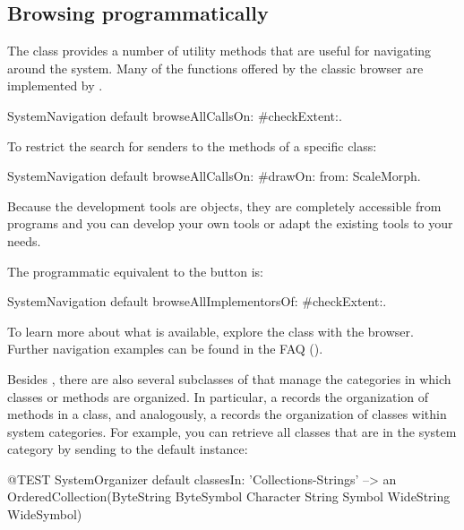 \documentclass[a4paper,10pt,twoside]{book}
\begin{document}

\subsection{Browsing programmatically}

The class  provides a number of utility methods that are useful for navigating around the system.
Many of the functions offered by the classic browser are implemented by .

\begin{code}{}
SystemNavigation default browseAllCallsOn: #checkExtent:.
\end{code}
To restrict the search for senders to the methods of a specific class:
\begin{code}{}
SystemNavigation default browseAllCallsOn: #drawOn: from: ScaleMorph.
\end{code}
Because the development tools are objects, they are completely accessible from programs and you can develop your own tools or adapt the existing tools to your needs.

The programmatic equivalent to the  button is:
\begin{code}{}
SystemNavigation default browseAllImplementorsOf: #checkExtent:.
\end{code}

To learn more about what is available, explore the class  with the browser.
Further navigation examples can be found in the FAQ ().

Besides , there are also several subclasses of  that manage the categories in which classes or methods are organized.
In particular, a  records the organization of methods in a class, and analogously, a  records the organization of classes within system categories.
For example, you can retrieve all classes that are in the system category  by sending  to the default  instance:
\begin{code}{@TEST}
SystemOrganizer default classesIn: 'Collections-Strings' --> an OrderedCollection(ByteString ByteSymbol Character String Symbol WideString WideSymbol)
\end{code}
\end{document}
